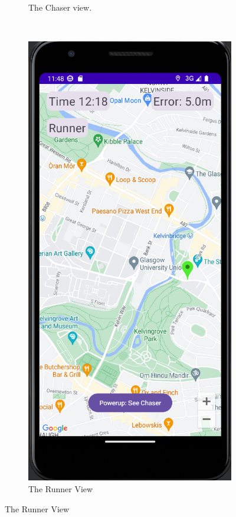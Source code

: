 \documentclass{l4proj}
\begin{document}
\begin{figure}
\begin{subfigure}[b]{0.3\textwidth}
        \caption{The Chaser view.}
        \label{fig:phase2_ui_chaser}
    \end{subfigure}
    ~ %
    \begin{subfigure}[b]{0.3\textwidth}
        \includegraphics[width=\textwidth]{images/phase2_ui_runner.png}
        \caption{The Runner View}
        \label{fig:phase2_ui_runner}
    \end{subfigure}
    

\end{figure}
\end{document}
